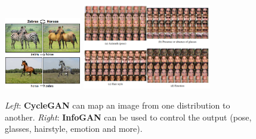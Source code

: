 \begin{figure}
    \centering
    \includegraphics[width=0.3\textwidth]{images/gan/cyclegan.png}
    \includegraphics[width=0.5\textwidth]{images/gan/infogan.png}
    \caption{\textit{Left}: \textbf{CycleGAN} can map an image from one distribution to another. \textit{Right}: \textbf{InfoGAN} can be used to control the output (pose, glasses, hairstyle, emotion and more).}
\end{figure}

